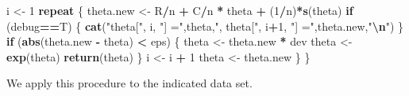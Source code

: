 \documentclass[
]{article}
\newenvironment{Shaded}{\begin{snugshade}}{\end{snugshade}}
\newcommand{\CommentTok}[1]{\textcolor[rgb]{0.56,0.35,0.01}{\textit{#1}}}
\newcommand{\ControlFlowTok}[1]{\textcolor[rgb]{0.13,0.29,0.53}{\textbf{#1}}}
\newcommand{\DecValTok}[1]{\textcolor[rgb]{0.00,0.00,0.81}{#1}}
\newcommand{\FunctionTok}[1]{\textcolor[rgb]{0.13,0.29,0.53}{\textbf{#1}}}
\newcommand{\NormalTok}[1]{#1}
\newcommand{\OtherTok}[1]{\textcolor[rgb]{0.56,0.35,0.01}{#1}}
\newcommand{\SpecialCharTok}[1]{\textcolor[rgb]{0.81,0.36,0.00}{\textbf{#1}}}
\newcommand{\StringTok}[1]{\textcolor[rgb]{0.31,0.60,0.02}{#1}}
\begin{document}
\begin{Shaded}
\begin{Highlighting}[]
\NormalTok{  i }\OtherTok{\textless{}{-}} \DecValTok{1}
  \ControlFlowTok{repeat}
\NormalTok{  \{}
\NormalTok{    theta.new }\OtherTok{\textless{}{-}}\NormalTok{ R}\SpecialCharTok{/}\NormalTok{n }\SpecialCharTok{+}\NormalTok{ C}\SpecialCharTok{/}\NormalTok{n }\SpecialCharTok{*}\NormalTok{ theta }\SpecialCharTok{+}\NormalTok{ (}\DecValTok{1}\SpecialCharTok{/}\NormalTok{n)}\SpecialCharTok{*}\FunctionTok{s}\NormalTok{(theta)}
    \ControlFlowTok{if}\NormalTok{ (debug}\SpecialCharTok{==}\NormalTok{T) \{ }\FunctionTok{cat}\NormalTok{(}\StringTok{"theta["}\NormalTok{, i, }\StringTok{"] ="}\NormalTok{,theta,}\StringTok{", theta["}\NormalTok{, i}\SpecialCharTok{+}\DecValTok{1}\NormalTok{, }\StringTok{"] ="}\NormalTok{,theta.new,}\StringTok{"}\SpecialCharTok{\textbackslash{}n}\StringTok{"}\NormalTok{) \}}
    \ControlFlowTok{if}\NormalTok{ (}\FunctionTok{abs}\NormalTok{(theta.new }\SpecialCharTok{{-}}\NormalTok{ theta) }\SpecialCharTok{\textless{}}\NormalTok{ eps)}
\NormalTok{    \{}
\NormalTok{      theta }\OtherTok{\textless{}{-}}\NormalTok{ theta.new }\SpecialCharTok{*}\NormalTok{ dev}
\NormalTok{      theta }\OtherTok{\textless{}{-}} \FunctionTok{exp}\NormalTok{(theta)}
      \FunctionTok{return}\NormalTok{(theta)}
\NormalTok{    \}}
\NormalTok{    i }\OtherTok{\textless{}{-}}\NormalTok{ i }\SpecialCharTok{+} \DecValTok{1}
\NormalTok{    theta }\OtherTok{\textless{}{-}}\NormalTok{ theta.new}
\NormalTok{  \}}
\NormalTok{\}}
\end{Highlighting}
\end{Shaded}

We apply this procedure to the indicated data set.

\begin{Shaded}
\end{Shaded}
\end{document}
